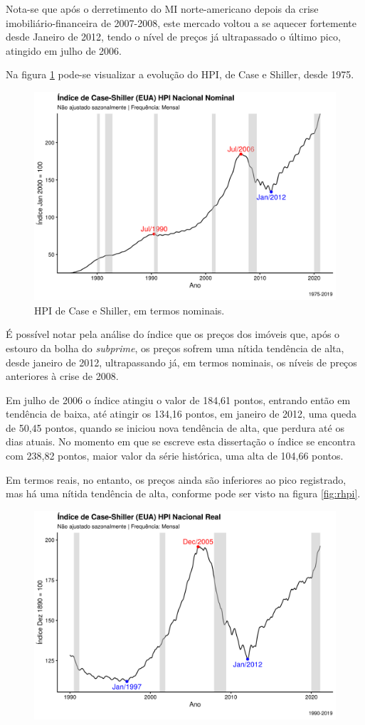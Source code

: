 \documentclass[
	12pt,				%
	oneside,			%
	a4paper,			%
	chapter=TITLE,		%
	section=TITLE,		%
	english,			%
	brazil				%
	]{abntex2}
\begin{document}
\begin{refsection}
Nota-se que após o derretimento do \gls{MI} norte-americano depois da crise
imobiliário-financeira de 2007-2008, este mercado voltou a se aquecer fortemente
desde Janeiro de 2012, tendo o nível de preços já ultrapassado o último pico,
atingido em julho de 2006.

Na figura \ref{fig:nhpi1} pode-se visualizar a evolução do \gls{HPI}, de Case e
Shiller, desde 1975.
\begin{figure}[H]

{\centering \includegraphics[width=0.7\linewidth]{images/nhpi1-1} 

}

\caption{\gls{HPI} de Case e Shiller, em termos nominais.}\label{fig:nhpi1}
\end{figure}
É possível notar pela análise do índice que os preços dos imóveis que, após o
estouro da bolha do \emph{subprime}, os preços sofrem uma nítida tendência de
alta, desde janeiro de 2012, ultrapassando já, em termos nominais, os níveis de
preços anteriores à crise de 2008.

Em julho de 2006 o índice atingiu o valor de 184,61
pontos, entrando então em tendência de baixa, até atingir os
134,16 pontos, em janeiro de 2012, uma queda de
50,45
pontos, quando se iniciou nova tendência de alta, que perdura até os dias atuais.
No momento em que se escreve esta dissertação o índice se encontra com
238,82 pontos, maior valor da série histórica, uma alta de
104,66
pontos.

Em termos reais, no entanto, os preços ainda são inferiores ao pico registrado,
mas há uma nítida tendência de alta, conforme pode ser visto na figura
\ref{fig:rhpi}.
\begin{figure}[H]

{\centering \includegraphics[width=0.7\linewidth]{images/rhpi1-1} 

}
\end{figure}
\end{refsection}
\end{document}
